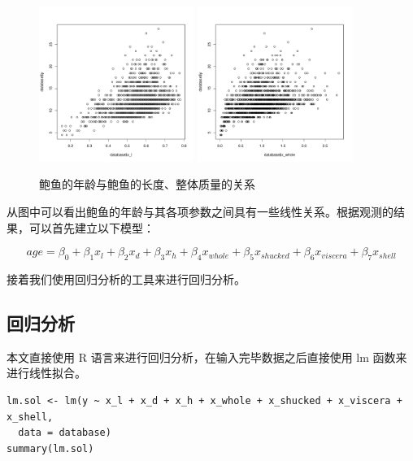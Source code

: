 \documentclass[hyperref,UTF8,12pt,a4paper]{ctexart}
\begin{document}
\begin{figure}[htbp]
  \center
  \includegraphics[width=0.45\textwidth]{male/length-1.png}
  \includegraphics[width=0.45\textwidth]{male/whole_weight-1.png}
  \caption{鲍鱼的年龄与鲍鱼的长度、整体质量的关系}
\end{figure}

从图中可以看出鲍鱼的年龄与其各项参数之间具有一些线性关系。根据观测的结果，可以首先建立以下模型：

\begin{equation}
  age = \beta_0 + \beta_1 x_l + \beta_2 x_d + \beta_3 x_h + \beta_4 x_{whole} + \beta_5 x_{shucked} + \beta_6 x_{viscera} + \beta_7 x_{shell}
\end{equation}

接着我们使用回归分析的工具来进行回归分析。

\subsection{回归分析}

本文直接使用 R 语言来进行回归分析，在输入完毕数据之后直接使用 lm 函数来进行线性拟合。

\begin{verbatim}
lm.sol <- lm(y ~ x_l + x_d + x_h + x_whole + x_shucked + x_viscera + x_shell,
  data = database)
summary(lm.sol)
\end{verbatim}
\end{document}
